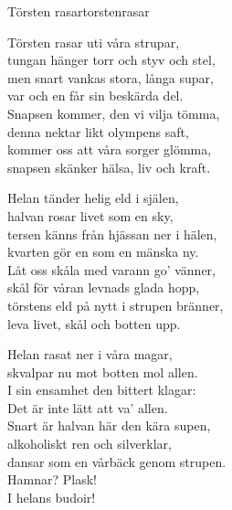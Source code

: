 \begin{song}{Törsten rasar}{torstenrasar}

\begin{vers}
Törsten rasar uti våra strupar,\\
tungan hänger torr och styv och stel,\\
men snart vankas stora, långa supar,\\
var och en får sin beskärda del.\\
Snapsen kommer, den vi vilja tömma,\\
denna nektar likt olympens saft,\\
kommer oss att våra sorger glömma,\\
snapsen skänker hälsa, liv och kraft.\\
\end{vers}
\begin{vers}
Helan tänder helig eld i själen,\\
halvan rosar livet som en sky,\\
tersen känns från hjässan ner i hälen,\\
kvarten gör en som en mänska ny.\\
Låt oss skåla med varann go' vänner,\\
skål för våran levnads glada hopp,\\
törstens eld på nytt i strupen bränner,\\
leva livet, skål och botten upp.\\
\end{vers}

\newp

\begin{vers}
Helan rasat ner i våra magar,\\
skvalpar nu mot botten mol allen.\\
I sin ensamhet den bittert klagar:\\
Det är inte lätt att va' allen.\\
Snart är halvan här den kära supen,\\
alkoholiskt ren och silverklar,\\
dansar som en vårbäck genom strupen.\\
Hamnar? Plask!\\
I helans budoir!\\
\end{vers}
\end{song}
